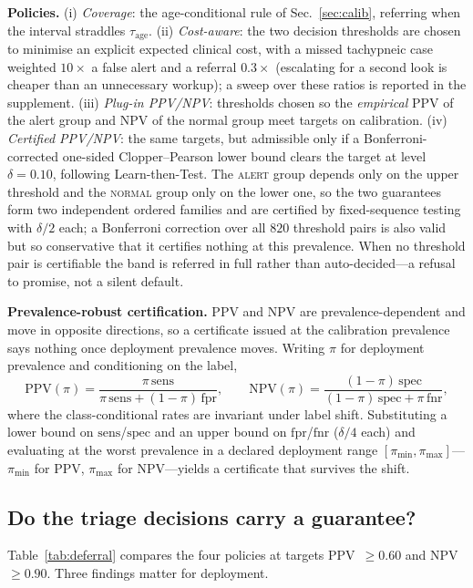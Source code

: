 \textbf{Policies.} (i) \emph{Coverage}: the age-conditional rule of Sec.~\ref{sec:calib}, referring when
the interval straddles $\tau_{\text{age}}$. (ii) \emph{Cost-aware}: the two decision thresholds are chosen
to minimise an explicit expected clinical cost, with a missed tachypneic case weighted $10\times$ a false
alert and a referral $0.3\times$ (escalating for a second look is cheaper than an unnecessary workup); a
sweep over these ratios is reported in the supplement. (iii) \emph{Plug-in PPV/NPV}: thresholds chosen so
the \emph{empirical} PPV of the alert group and NPV of the normal group meet targets on calibration.
(iv) \emph{Certified PPV/NPV}: the same targets, but admissible only if a Bonferroni-corrected one-sided
Clopper--Pearson lower bound clears the target at level $\delta=0.10$, following Learn-then-Test. The
\textsc{alert} group depends only on the upper threshold and the \textsc{normal} group only on the lower
one, so the two guarantees form two independent ordered families and are certified by fixed-sequence
testing with $\delta/2$ each; a Bonferroni correction over all $820$ threshold pairs is also valid but so
conservative that it certifies nothing at this prevalence. When no threshold pair is certifiable the band
is referred in full rather than auto-decided---a refusal to promise, not a silent default.

\textbf{Prevalence-robust certification.} PPV and NPV are prevalence-dependent and move in opposite
directions, so a certificate issued at the calibration prevalence says nothing once deployment prevalence
moves. Writing $\pi$ for deployment prevalence and conditioning on the label,
\begin{equation}
\text{PPV}(\pi)=\frac{\pi\,\text{sens}}{\pi\,\text{sens}+(1-\pi)\,\text{fpr}},\qquad
\text{NPV}(\pi)=\frac{(1-\pi)\,\text{spec}}{(1-\pi)\,\text{spec}+\pi\,\text{fnr}},
\end{equation}
where the class-conditional rates are invariant under label shift. Substituting a lower bound on
$\text{sens}$/$\text{spec}$ and an upper bound on $\text{fpr}$/$\text{fnr}$ ($\delta/4$ each) and
evaluating at the worst prevalence in a declared deployment range $[\pi_{\min},\pi_{\max}]$---$\pi_{\min}$
for PPV, $\pi_{\max}$ for NPV---yields a certificate that survives the shift.


\subsection{Do the triage decisions carry a guarantee?}\label{sec:guarantee}
Table~\ref{tab:deferral} compares the four policies at targets PPV~$\ge0.60$ and NPV~$\ge0.90$. Three
findings matter for deployment.

